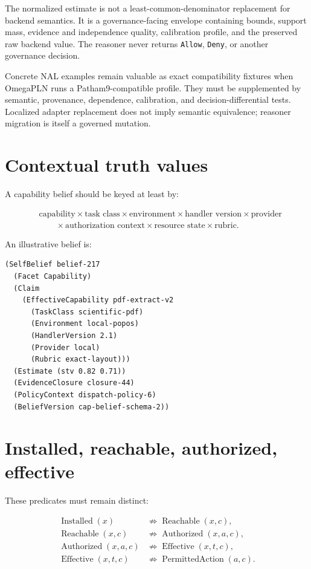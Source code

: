 \documentclass[11pt,oneside]{report}
\begin{document}
The normalized estimate is not a least-common-denominator replacement for backend semantics. It is a governance-facing envelope containing bounds, support mass, evidence and independence quality, calibration profile, and the preserved raw backend value. The reasoner never returns \texttt{Allow}, \texttt{Deny}, or another governance decision.

Concrete NAL examples remain valuable as exact compatibility fixtures when OmegaPLN runs a Patham9-compatible profile. They must be supplemented by semantic, provenance, dependence, calibration, and decision-differential tests. Localized adapter replacement does not imply semantic equivalence; reasoner migration is itself a governed mutation.

\section{Contextual truth values}

A capability belief should be keyed at least by:

\[
\begin{aligned}
&\text{capability}\times\text{task class}\times\text{environment}\times\text{handler version}\times\text{provider}\\
&\qquad\times\text{authorization context}\times\text{resource state}\times\text{rubric}.
\end{aligned}
\]

An illustrative belief is:

\begin{lstlisting}[language=Metta,caption={Backend-specific capability value preserved behind a neutral result envelope}]
(SelfBelief belief-217
  (Facet Capability)
  (Claim
    (EffectiveCapability pdf-extract-v2
      (TaskClass scientific-pdf)
      (Environment local-popos)
      (HandlerVersion 2.1)
      (Provider local)
      (Rubric exact-layout)))
  (Estimate (stv 0.82 0.71))
  (EvidenceClosure closure-44)
  (PolicyContext dispatch-policy-6)
  (BeliefVersion cap-belief-schema-2))
\end{lstlisting}

\section{Installed, reachable, authorized, effective}

These predicates must remain distinct:

\begin{align*}
\operatorname{Installed}(x) &\not\Rightarrow \operatorname{Reachable}(x,c),\\
\operatorname{Reachable}(x,c) &\not\Rightarrow \operatorname{Authorized}(x,a,c),\\
\operatorname{Authorized}(x,a,c) &\not\Rightarrow \operatorname{Effective}(x,t,c),\\
\operatorname{Effective}(x,t,c) &\not\Rightarrow \operatorname{PermittedAction}(a,c).
\end{align*}
\end{document}
